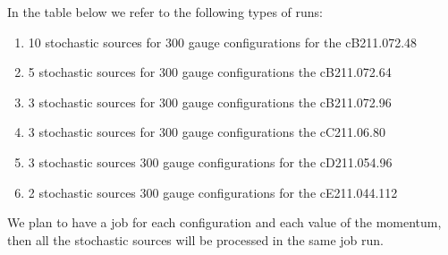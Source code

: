 In the table below we refer to the following types of runs:
\begin{enumerate}
	\item \label{rt:cB48} 10 stochastic sources for 300 gauge configurations for the cB211.072.48
	\item \label{rt:cB64} 5 stochastic sources for 300 gauge configurations the cB211.072.64
	\item \label{rt:cB96} 3 stochastic sources for 300 gauge configurations the cB211.072.96
	\item \label{rt:cC80} 3 stochastic sources for 300 gauge configurations the cC211.06.80
	\item \label{rt:cD96}  3 stochastic sources 300 gauge configurations for the cD211.054.96
	\item  \label{rt:cE112} 2 stochastic sources 300 gauge configurations for the cE211.044.112
\end{enumerate}
We plan to have a job for each configuration and each value of the momentum, then
all the stochastic sources will be processed in the same job run.

